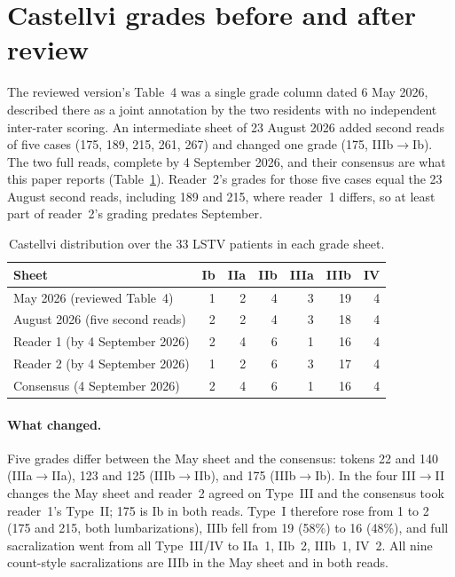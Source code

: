 \section{Castellvi grades before and after review}
\label{app:castellvi}

The reviewed version's Table~4 was a single grade column
dated 6 May 2026, described there as a joint annotation by
the two residents with no independent inter-rater
scoring. An intermediate sheet of 23 August 2026 added
second reads of five cases (175, 189, 215, 261, 267) and
changed one grade (175, IIIb$\to$Ib). The two full reads,
complete by 4 September 2026, and their consensus are
what this paper reports (Table~\ref{tab:castellvi_hist}).
Reader~2's grades for those five cases equal the 23 August
second reads, including 189 and 215, where reader~1
differs, so at least part of reader~2's grading predates
September.

\begin{table}[h]
\caption{Castellvi distribution over the 33 LSTV patients
in each grade sheet.}
\label{tab:castellvi_hist}
\centering
\small
\begin{tabular}{lrrrrrr}
\toprule
\bfseries Sheet & \bfseries Ib & \bfseries IIa & \bfseries IIb & \bfseries IIIa & \bfseries IIIb & \bfseries IV \\
\midrule
May 2026 (reviewed Table~4)       & 1 & 2 & 4 & 3 & 19 & 4 \\
August 2026 (five second reads)   & 2 & 2 & 4 & 3 & 18 & 4 \\
Reader 1 (by 4 September 2026)    & 2 & 4 & 6 & 1 & 16 & 4 \\
Reader 2 (by 4 September 2026)    & 1 & 2 & 6 & 3 & 17 & 4 \\
Consensus (4 September 2026)      & 2 & 4 & 6 & 1 & 16 & 4 \\
\bottomrule
\end{tabular}
\end{table}

\paragraph{What changed.}
Five grades differ between the May sheet and the
consensus: tokens 22 and 140 (IIIa$\to$IIa), 123 and 125
(IIIb$\to$IIb), and 175 (IIIb$\to$Ib). In the four
III$\to$II changes the May sheet and reader~2 agreed on
Type~III and the consensus took reader~1's Type~II; 175 is
Ib in both reads. Type~I therefore rose from 1
to 2 (175 and 215, both lumbarizations), IIIb fell from
19 (58\%) to 16 (48\%), and full sacralization went from
all Type~III/IV to IIa~1, IIb~2, IIIb~1, IV~2. All nine
count-style sacralizations are IIIb in the May sheet and
in both reads.


